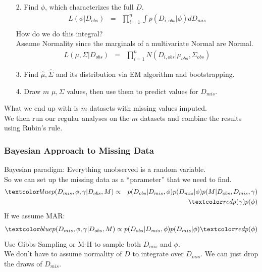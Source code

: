 \documentclass[handout]{beamer}
\begin{document}
\begin{frame}
\begin{enumerate}
\item[2.] Find $\phi$, which characterizes the full $D$.
\pause
\begin{eqnarray*}
L(\phi | D_{obs}) &=& \prod_{i=1}^n \int p(D_{i,obs} | \phi) dD_{mis} \\
\end{eqnarray*}
\pause
How do we do this integral? \\
\pause
\bigskip
Assume Normality since the marginals of a multivariate Normal are Normal.
\pause
\begin{eqnarray*}
L(\mu, \Sigma | D_{obs}) &=& \prod_{i=1}^n N(D_{i,obs} | \mu_{obs},
\Sigma_{obs}) 
\end{eqnarray*}
\pause
\item[3.] Find $\hat{\mu}, \hat{\Sigma}$ and its distribution via EM algorithm and bootstrapping.
\pause
\item[4.] Draw $m$ $\mu, \Sigma$ values, then use them to predict values for $D_{mis}$.
\end{enumerate}
\end{frame}

\begin{frame}
What we end up with is $m$ datasets with missing values imputed. \\
\pause
\bigskip
We then run our regular analyses on the $m$ datasets and combine the
results using Rubin's rule.
\end{frame}

\begin{frame}
\frametitle{Bayesian Approach to Missing Data}
\pause
Bayesian paradigm: Everything unobserved is a random variable.\\
\bigskip
\pause
So we can set up the missing data as a ``parameter'' that we need to find.
\pause
\begin{eqnarray*}
\blue{p(D_{mis}, \phi, \gamma | D_{obs}, M)} &\propto& p(D_{obs}| D_{mis}
, \phi) p(D_{mis}|\phi) p(M | D_{obs}, D_{mis}, \gamma) \\
&\phantom{\propto} &\red{p(\gamma) p(\phi)}
\end{eqnarray*}
\pause
If we assume MAR:
\pause
\begin{eqnarray*}
\blue{p(D_{mis}, \phi, \gamma | D_{obs}, M)} \propto p(D_{obs}| D_{mis}
, \phi) p(D_{mis}|\phi) \red{p(\phi)}\\
\end{eqnarray*}
\pause
Use Gibbs Sampling or M-H to sample both $D_{mis}$ and $\phi$.\\
\pause
\bigskip
We don't have to assume normality of $D$ to integrate over
$D_{mis}$. \pause We can just drop the draws of $D_{mis}$.
\end{frame}
\end{document}
